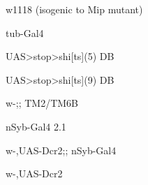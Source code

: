 \documentclass[17pt]{extarticle}
\begin{document}
\newpage{}
\vspace*{\fill}\begin{footnotesize}
w1118 (isogenic to Mip mutant) \\[0.5em]
\end{footnotesize}
\footnotesize
\vspace*{\fill}
\newpage{}
\vspace*{\fill}\begin{large}
tub-Gal4 \\[0.5em]
\end{large}
\footnotesize
\vspace*{\fill}
\newpage{}
\vspace*{\fill}\begin{footnotesize}
UAS>stop>shi[ts](5) DB \\[0.5em]
\end{footnotesize}
\footnotesize
\vspace*{\fill}
\newpage{}
\vspace*{\fill}\begin{footnotesize}
UAS>stop>shi[ts](9) DB \\[0.5em]
\end{footnotesize}
\footnotesize
\vspace*{\fill}
\newpage{}
\vspace*{\fill}\begin{normalsize}
w-;; TM2/TM6B \\[0.5em]
\end{normalsize}
\footnotesize
\vspace*{\fill}
\newpage{}
\vspace*{\fill}\begin{normalsize}
nSyb-Gal4 2.1 \\[0.5em]
\end{normalsize}
\footnotesize
\vspace*{\fill}
\newpage{}
\vspace*{\fill}\begin{footnotesize}
w-,UAS-Dcr2;; nSyb-Gal4 \\[0.5em]
\end{footnotesize}
\footnotesize
\vspace*{\fill}
\newpage{}
\vspace*{\fill}\begin{normalsize}
w-,UAS-Dcr2 \\[0.5em]
\end{normalsize}
\footnotesize
\vspace*{\fill}
\end{document}
